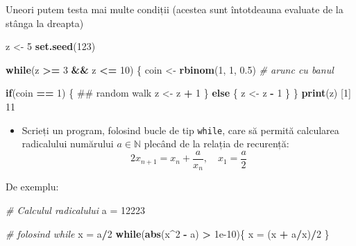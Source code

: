 \documentclass[]{article}
\newenvironment{Shaded}{\begin{snugshade}}{\end{snugshade}}
\newcommand{\KeywordTok}[1]{\textcolor[rgb]{0.13,0.29,0.53}{\textbf{#1}}}
\newcommand{\DecValTok}[1]{\textcolor[rgb]{0.00,0.00,0.81}{#1}}
\newcommand{\FloatTok}[1]{\textcolor[rgb]{0.00,0.00,0.81}{#1}}
\newcommand{\StringTok}[1]{\textcolor[rgb]{0.31,0.60,0.02}{#1}}
\newcommand{\CommentTok}[1]{\textcolor[rgb]{0.56,0.35,0.01}{\textit{#1}}}
\newcommand{\ControlFlowTok}[1]{\textcolor[rgb]{0.13,0.29,0.53}{\textbf{#1}}}
\newcommand{\OperatorTok}[1]{\textcolor[rgb]{0.81,0.36,0.00}{\textbf{#1}}}
\newcommand{\NormalTok}[1]{#1}
\newenvironment{frshaded*}{%
  \def\FrameCommand{\fboxrule=\FrameRule\fboxsep=\FrameSep \fcolorbox{framecolor}{shadecolor1}}%
  \MakeFramed {\advance\hsize-\width \FrameRestore}}%
{\endMakeFramed}
\newenvironment{rmdblock}[1]
  {\begin{frshaded*}
  \begin{itemize}
  \renewcommand{\labelitemi}{
    \raisebox{-.7\height}[0pt][0pt]{
      {\setkeys{Gin}{width=2em,keepaspectratio}\texttt{[image: images/icons/\#1]}}
    }
  }
  \item
  }
  {
  \end{itemize}
  \end{frshaded*}
  }
\newenvironment{rmdexercise}
  {\begin{rmdblock}{exercise}}
  {\end{rmdblock}}
\begin{document}
Uneori putem testa mai multe condiții (acestea sunt întotdeauna evaluate
de la stânga la dreapta)

\begin{Shaded}
\begin{Highlighting}[]
\NormalTok{z <-}\StringTok{ }\DecValTok{5}
\KeywordTok{set.seed}\NormalTok{(}\DecValTok{123}\NormalTok{)}

\ControlFlowTok{while}\NormalTok{(z }\OperatorTok{>=}\StringTok{ }\DecValTok{3} \OperatorTok{&&}\StringTok{ }\NormalTok{z }\OperatorTok{<=}\StringTok{ }\DecValTok{10}\NormalTok{) \{}
\NormalTok{        coin <-}\StringTok{ }\KeywordTok{rbinom}\NormalTok{(}\DecValTok{1}\NormalTok{, }\DecValTok{1}\NormalTok{, }\FloatTok{0.5}\NormalTok{) }\CommentTok{# arunc cu banul}
        
        \ControlFlowTok{if}\NormalTok{(coin }\OperatorTok{==}\StringTok{ }\DecValTok{1}\NormalTok{) \{  ## random walk}
\NormalTok{                z <-}\StringTok{ }\NormalTok{z }\OperatorTok{+}\StringTok{ }\DecValTok{1}
\NormalTok{        \} }\ControlFlowTok{else}\NormalTok{ \{}
\NormalTok{                z <-}\StringTok{ }\NormalTok{z }\OperatorTok{-}\StringTok{ }\DecValTok{1}
\NormalTok{        \} }
\NormalTok{\}}
\KeywordTok{print}\NormalTok{(z)}
\NormalTok{[}\DecValTok{1}\NormalTok{] }\DecValTok{11}
\end{Highlighting}
\end{Shaded}

\begin{rmdexercise}
Scrieți un program, folosind bucle de tip \texttt{while}, care să
permită calcularea radicalului numărului \(a\in\mathbb{N}\) plecând de
la relația de recurență: \[
  2x_{n+1} = x_n + \frac{a}{x_n},\quad x_1 = \frac{a}{2}
\]
\end{rmdexercise}

De exemplu:

\begin{Shaded}
\begin{Highlighting}[]
\CommentTok{# Calculul radicalului}
\NormalTok{a =}\StringTok{ }\DecValTok{12223}

\CommentTok{# folosind while}
\NormalTok{x =}\StringTok{ }\NormalTok{a}\OperatorTok{/}\DecValTok{2}
\ControlFlowTok{while}\NormalTok{(}\KeywordTok{abs}\NormalTok{(x}\OperatorTok{^}\DecValTok{2} \OperatorTok{-}\StringTok{ }\NormalTok{a) }\OperatorTok{>}\StringTok{ }\FloatTok{1e-10}\NormalTok{)\{}
\NormalTok{  x =}\StringTok{ }\NormalTok{(x }\OperatorTok{+}\StringTok{ }\NormalTok{a}\OperatorTok{/}\NormalTok{x)}\OperatorTok{/}\DecValTok{2}
\NormalTok{\}}
\end{Highlighting}
\end{Shaded}
\end{document}
